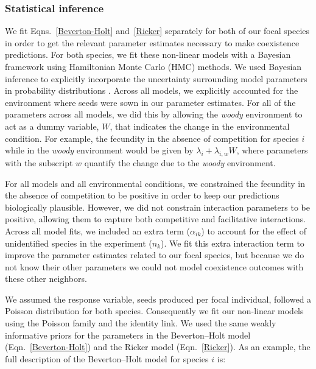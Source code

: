 \begin{refsection}
\subsubsection*{Statistical inference}

We fit Eqns.~\ref{Beverton-Holt} and~\ref{Ricker} separately for both of our focal species in order to get the relevant parameter estimates necessary to make coexistence predictions. For both species, we fit these non-linear models with a Bayesian framework using Hamiltonian Monte Carlo (HMC) methods. We used Bayesian inference to explicitly incorporate the uncertainty surrounding model parameters in probability distributions \citep{mcelreath_statistical_2018}. Across all models, we explicitly accounted for the environment where seeds were sown in our parameter estimates. For all of the parameters across all models, we did this by allowing the \textit{woody} environment to act as a dummy variable, $W$, that indicates the change in the environmental condition. For example, the fecundity in the absence of competition for species $i$ while in the \textit{woody} environment would be given by $\lambda_{i} + \lambda_{i,w}W$, where parameters with the subscript $w$ quantify the change due to the \textit{woody} environment.


For all models and all environmental conditions, we constrained the fecundity in the absence of competition  to be positive in order to keep our predictions biologically plausible. However, we did not constrain interaction parameters to be positive, allowing them to capture both competitive and facilitative interactions. Across all model fits, we included an extra term ($\alpha_{ik}$) to account for the effect of unidentified species in the experiment ($n_{k}$). We fit this extra interaction term to improve the parameter estimates  related to our focal species, but because we do not know their other parameters we could not model coexistence outcomes with these other neighbors.

We assumed the response variable, seeds produced per focal individual, followed a Poisson distribution for both species. Consequently we fit our non-linear models using the Poisson family and the identity link. We used the same weakly informative priors for the parameters in the Beverton--Holt model (Eqn.~\ref{Beverton-Holt}) and the Ricker model (Eqn.~\ref{Ricker}). As an example, the full description of the Beverton--Holt model for species $i$ is:


\end{refsection}
